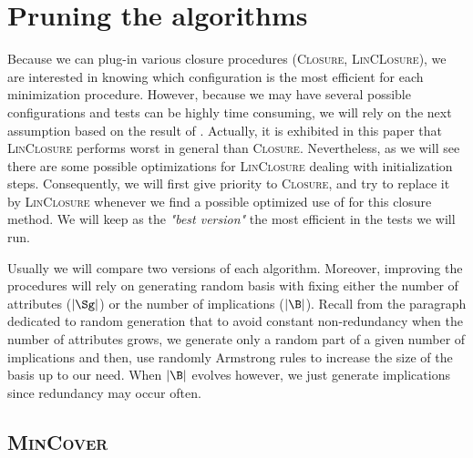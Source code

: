 \section{Pruning the algorithms}

Because we can plug-in various closure procedures (\textsc{Closure}, \textsc{LinCLosure}), we are interested in knowing which configuration is
the most efficient for each minimization procedure. However, because we may
have several possible configurations and tests can be highly time consuming,
we will rely on the next assumption based on the result of \cite{bazhanov_optimizations_2014}. Actually, it is exhibited in this paper
that \textsc{LinClosure} performs worst in general than \textsc{Closure}. Nevertheless, as we will see there are some possible optimizations for \textsc{LinClosure} dealing with initialization steps. Consequently, 
we will first give priority to \textsc{Closure}, and try to replace it 
by \textsc{LinClosure} whenever we find a possible optimized use of 
for this closure method. We will keep as the \textit{"best version"} the most efficient in the tests we will run. 

\vspace{1.2em}

Usually we will compare two versions of each algorithm. Moreover, improving
the procedures will rely on generating random basis with fixing either the
number of attributes ($|\Sg|$) or the number of implications ($|\B|$). Recall from the paragraph dedicated to random generation that to avoid constant non-redundancy when the number of attributes grows, we generate only a random part of a given number of implications and then, use randomly Armstrong rules to increase the size of the basis up to our need. When $|\B|$ evolves however,
we just generate implications since redundancy may occur often.

\subsection{\textsc{MinCover}}

